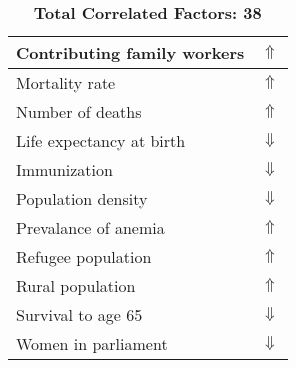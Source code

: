 \documentclass[12pt,notitlepage,oneside]{report}
\begin{document}
\begin{table}[!htb]
\begin{tabular}{|l|l|}
Contributing family workers & $\Uparrow$\\ \hline
Mortality rate & $\Uparrow$\\ \hline
Number of deaths & $\Uparrow$\\ \hline
Life expectancy at birth & $\Downarrow$\\ \hline
Immunization & $\Downarrow$\\ \hline
Population density & $\Downarrow$\\ \hline
Prevalance of anemia & $\Uparrow$\\ \hline
Refugee population & $\Uparrow$\\ \hline
Rural population & $\Uparrow$\\ \hline
Survival to age 65 & $\Downarrow$\\ \hline
Women in parliament & $\Downarrow$\\ \hline
\end{tabular}
\caption*{\textbf{Total Correlated Factors: 38}}
\end{table}
\clearpage
\end{document}
